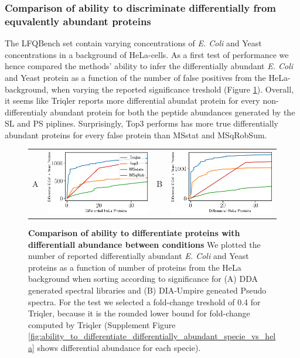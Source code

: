 \documentclass[10pt,letterpaper]{article}
\begin{document}
\subsubsection*{Comparison of ability to discriminate differentially from equvalently abundant proteins}

The LFQBench set contain varying concentrations of {\em E. Coli} and Yeast concentrations in a background of HeLa-cells. As a first test of performance we hence compared the methods' ability to infer the differentially abundant {\em E. Coli} and Yeast protein as a function of the number of false positives from the HeLa-background, when varying the reported significance treshold (Figure \ref{fig:diff_vs_hela}).  Overall, it seems like Triqler reports more differential abundat protein for every non-differentialy abundant protein for both the peptide abundances generated by the SL and PS piplines. Surprisingly, Top3 performs has more true differentially abundant proteins for every false protein than MSstat and MSqRobSum. 


\begin{figure}[hbt]
    \centering
    \begin{tabular}{lclc} 
        A & \includegraphics[width=0.45\linewidth]{../../result/report_plots_filtered/osw_de_human_vs_ecoli_and_yeast.png} & 
        B & \includegraphics[width=0.45\linewidth]{../../result/report_plots_filtered/diann_de_human_vs_ecoli_and_yeast.png} \\ 

    \end{tabular} 
    \caption{{\bf Comparison of ability to differentiate proteins with differentiall abundance between conditions} We plotted the number of reported differentially abundant  {\em E. Coli} and Yeast proteins as a function of number of proteins from the HeLa background when sorting according to significance for (A) DDA generated spectral libraries and (B) DIA-Umpire geneated Pseudo spectra. For the test we selected a fold-change treshold of 0.4 for Triqler, because it is the rounded lower bound for fold-change computed by Triqler (Supplement Figure \ref{fig:ability_to_differentiate_differentially_abundant_specie_vs_hela} shows differential abundance for each specie). \label{fig:diff_vs_hela}}
\end{figure}
\end{document}
